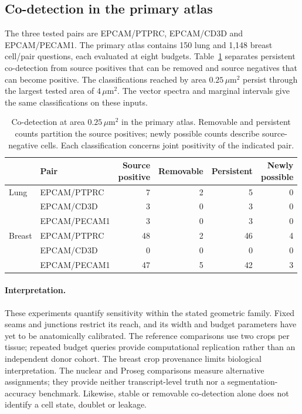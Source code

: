\documentclass[10pt,letterpaper]{article}
\begin{document}
\FloatBarrier
\subsection{Co-detection in the primary atlas}
The three tested pairs are EPCAM/PTPRC, EPCAM/CD3D and EPCAM/PECAM1. The primary atlas contains 150 lung and 1,148 breast cell/pair questions, each evaluated at eight budgets. Table~\ref{tab:codetection} separates persistent co-detection from source positives that can be removed and source negatives that can become positive. The classifications reached by area $0.25\,\mu\mathrm m^2$ persist through the largest tested area of $4\,\mu\mathrm m^2$. The vector spectra and marginal intervals give the same classifications on these inputs.

\begin{table}[ht]\centering
\begin{tabular}{llrrrr}\toprule
 &Pair&\shortstack{Source\\positive}&Removable&Persistent&\shortstack{Newly\\possible}\\\midrule
Lung&EPCAM/PTPRC&7&2&5&0\\
 &EPCAM/CD3D&3&0&3&0\\
 &EPCAM/PECAM1&3&0&3&0\\
Breast&EPCAM/PTPRC&48&2&46&4\\
 &EPCAM/CD3D&0&0&0&0\\
 &EPCAM/PECAM1&47&5&42&3\\\bottomrule
\end{tabular}
\caption{Co-detection at area $0.25\,\mu\mathrm m^2$ in the primary atlas. Removable and persistent counts partition the source positives; newly possible counts describe source-negative cells. Each classification concerns joint positivity of the indicated pair.}\label{tab:codetection}
\end{table}

\paragraph{Interpretation.}
These experiments quantify sensitivity within the stated geometric family. Fixed seams and junctions restrict its reach, and its width and budget parameters have yet to be anatomically calibrated. The reference comparisons use two crops per tissue; repeated budget queries provide computational replication rather than an independent donor cohort. The breast crop provenance limits biological interpretation. The nuclear and Proseg comparisons measure alternative assignments; they provide neither transcript-level truth nor a segmentation-accuracy benchmark. Likewise, stable or removable co-detection alone does not identify a cell state, doublet or leakage.
\end{document}
